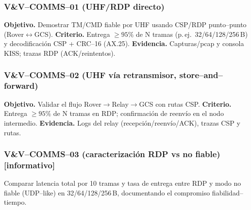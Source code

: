 \subsubsection*{V\&V--COMMS--01 (UHF/RDP directo)}
\textbf{Objetivo.} Demostrar TM/CMD fiable por UHF usando CSP/RDP punto--punto (Rover$\leftrightarrow$GCS).
\textbf{Criterio.} Entrega $\ge 95\%$ de N tramas (p.\,ej.\ 32/64/128/256\,B) y decodificación CSP + CRC--16 (AX.25).
\textbf{Evidencia.} Capturas/pcap y consola KISS; trazas RDP (ACK/reintentos).

\subsubsection*{V\&V--COMMS--02 (UHF vía retransmisor, store--and--forward)}
\textbf{Objetivo.} Validar el flujo Rover$\rightarrow$Relay$\rightarrow$GCS con rutas CSP.
\textbf{Criterio.} Entrega $\ge 95\%$ de N tramas en RDP; confirmación de reenvío en el nodo intermedio.
\textbf{Evidencia.} Logs del relay (recepción/reenvío/ACK), trazas CSP y rutas.

\subsubsection*{V\&V--COMMS--03 (caracterización RDP vs no fiable) [informativo]}
Comparar latencia total por 10 tramas y tasa de entrega entre RDP y modo no fiable (UDP--like) en
32/64/128/256\,B, documentando el compromiso fiabilidad--tiempo.



